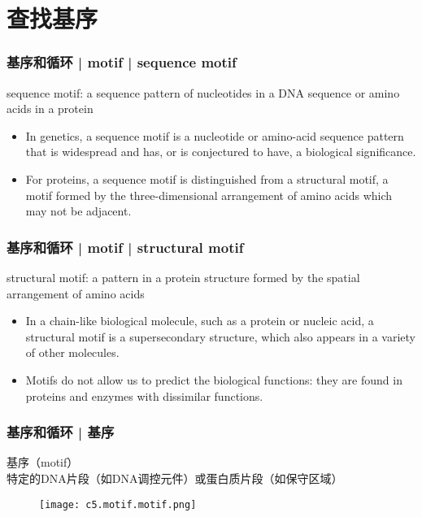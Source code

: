 \section{查找基序}
\begin{frame}
  \frametitle{基序和循环 | motif | sequence motif}
  \begin{block}{sequence motif: a sequence pattern of nucleotides in a DNA sequence or amino acids in a protein}
    \begin{itemize}
      \item In genetics, a sequence motif is a nucleotide or amino-acid sequence pattern that is widespread and has, or is conjectured to have, a biological significance.
      \item For proteins, a sequence motif is distinguished from a structural motif, a motif formed by the three-dimensional arrangement of amino acids which may not be adjacent.
    \end{itemize}
  \end{block}
\end{frame}

\begin{frame}
  \frametitle{基序和循环 | motif | structural motif}
  \begin{block}{structural motif: a pattern in a protein structure formed by the spatial arrangement of amino acids}
    \begin{itemize}
      \item In a chain-like biological molecule, such as a protein or nucleic acid, a structural motif is a supersecondary structure, which also appears in a variety of other molecules.
      \item Motifs do not allow us to predict the biological functions: they are found in proteins and enzymes with dissimilar functions.
    \end{itemize}
  \end{block}
\end{frame}


\begin{frame}
  \frametitle{基序和循环 | 基序}
  \begin{block}{基序（motif）}
    特定的DNA片段（如DNA调控元件）或蛋白质片段（如保守区域）
  \end{block}
  \begin{figure}
    \centering
    \texttt{[image: c5.motif.motif.png]}
  \end{figure}
\end{frame}

